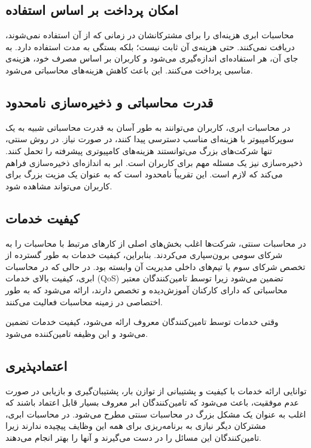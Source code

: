 \documentclass{book}
\begin{document}

    \subsection{امکان پرداخت بر اساس استفاده}
    محاسبات ابری هزینه‌ای را برای مشترکانشان در زمانی که از آن استفاده نمی‌شوند، دریافت نمی‌کنند. حتی هزینه‌ی آن ثابت نیست؛ بلکه بستگی به مدت استفاده دارد. به جای آن، هر استفاده‌ای اندازه‌گیری می‌شود و کاربران بر اساس مصرف خود، هزینه‌ی مناسبی پرداخت می‌کنند. این باعث کاهش هزینه‌های محاسباتی می‌شود.

    \subsection{قدرت محاسباتی و ذخیره‌سازی نامحدود}
    در محاسبات ابری، کاربران می‌توانند به طور آسان به قدرت محاسباتی شبیه به یک سوپرکامپیوتر با هزینه‌ای مناسب دسترسی پیدا کنند، در صورت نیاز. در روش سنتی، تنها شرکت‌های بزرگ می‌توانستند هزینه‌های کامپیوتری پیشرفته را تحمل کنند. ذخیره‌سازی نیز یک مسئله مهم برای کاربران است. ابر به اندازه‌ای ذخیره‌سازی فراهم می‌کند که لازم است. این تقریباً نامحدود است که به عنوان یک مزیت بزرگ برای کاربران می‌تواند مشاهده شود.

    \subsection{کیفیت خدمات}
    در محاسبات سنتی، شرکت‌ها اغلب بخش‌های اصلی از کارهای مرتبط با محاسبات را به شرکای سومی برون‌سپاری می‌کردند. بنابراین، کیفیت خدمات به طور گسترده از تخصص شرکای سوم یا تیم‌های داخلی مدیریت آن وابسته بود. در حالی که در محاسبات ابری، کیفیت بالای خدمات (QoS) تضمین می‌شود زیرا توسط تامین‌کنندگان معتبر محاسباتی که دارای کارکنان آموزش‌دیده و تخصص دارند، ارائه می‌شود که به طور اختصاصی در زمینه محاسبات فعالیت می‌کنند.
    
    وقتی خدمات توسط تامین‌کنندگان معروف ارائه می‌شود، کیفیت خدمات تضمین می‌شود و این وظیفه تامین‌کننده می‌شود.

    \subsection{اعتماد‌پذیری}
    توانایی ارائه خدمات با کیفیت و پشتیبانی از توازن بار، پشتیبان‌گیری و بازیابی در صورت عدم موفقیت، باعث می‌شود که تامین‌کنندگان ابر معروف بسیار قابل اعتماد باشند که اغلب به عنوان یک مشکل بزرگ در محاسبات سنتی مطرح می‌شود. در محاسبات ابری، مشترکان دیگر نیازی به برنامه‌ریزی برای همه این وظایف پیچیده ندارند زیرا تامین‌کنندگان این مسائل را در دست می‌گیرند و آنها را بهتر انجام می‌دهند.
\end{document}
